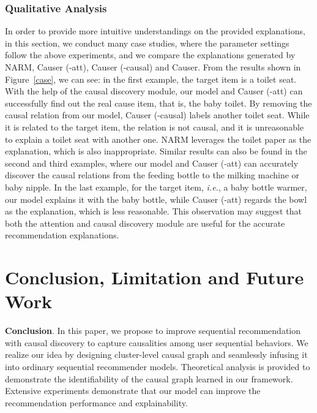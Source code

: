 \documentclass[conference]{IEEEtran}
\theoremstyle{definition}
\theoremstyle{theorem}
\theoremstyle{proof}
\theoremstyle{remark}
\begin{document}
\subsubsection{Qualitative Analysis}
In order to provide more intuitive understandings on the provided explanations, in this section, we conduct many case studies, where the parameter settings follow the above experiments, and we compare the explanations generated by NARM, Causer (-att), Causer (-causal) and Causer.
From the results shown in Figure~\ref{case}, we can see:
in the first example, the target item is a toilet seat.
With the help of the causal discovery module, our model and Causer (-att) can successfully find out the real cause item, that is, the baby toilet.
{By removing the causal relation from our model, Causer (-causal) labels another toilet seat.
While it is related to the target item, the relation is not causal, and it is unreasonable to explain a toilet seat with another one.
NARM leverages the toilet paper as the explanation, which is also inappropriate.
}
Similar results can also be found in the second and third examples, where our model and Causer (-att) can accurately discover the causal relations from the feeding bottle to the milking machine or baby nipple.
In the last example, for the target item, \emph{i.e.}, a baby bottle warmer, our model explains it with the baby bottle, while Causer (-att) regards the bowl as the explanation, which is less reasonable.
This observation may suggest that both the attention and causal discovery module are useful for the accurate recommendation explanations.



\section{Conclusion, Limitation and Future Work}\label{conclu}
\textbf{Conclusion}. In this paper, we propose to improve sequential recommendation with causal discovery to capture causalities among user sequential behaviors.
We realize our idea by designing cluster-level causal graph and seamlessly infusing it into ordinary sequential recommender models.
Theoretical analysis {is} provided to demonstrate the identifiability of the causal graph learned in our framework.
Extensive experiments demonstrate that our model can improve the recommendation performance and explainability.
\end{document}

